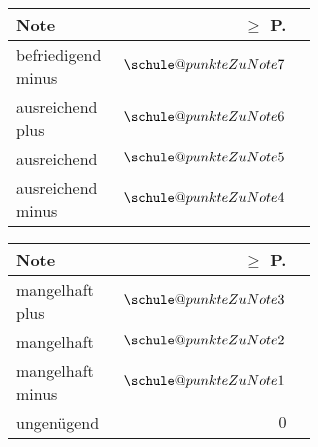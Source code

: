{{{{            }
            \parbox{.24\linewidth}{
                \tiny
                \begin{tabular}{|p{0.6\linewidth}|r|r|}\hline
                    \rowcolor{black!20}\textbf{Note}  &
                    \textbf{$\ge$ P.}
                    \\\hline
                    befriedigend minus  & $\schule@punkteZuNote{7}$\\\hline
                    \rowcolor{black!10}
                    ausreichend plus  & $\schule@punkteZuNote{6}$\\\hline
                    ausreichend & $\schule@punkteZuNote{5}$\\\hline
                    \rowcolor{black!10}
                    ausreichend minus & $\schule@punkteZuNote{4}$\\\hline
                \end{tabular}
            }
            \parbox{.24\linewidth}{
                \tiny
                \begin{tabular}{|p{0.6\linewidth}|r|r|}\hline
                    \rowcolor{black!20}\textbf{Note}  &
                    \textbf{$\ge$ P.}
                    \\\hline
                    mangelhaft plus & $\schule@punkteZuNote{3}$\\\hline
                    \rowcolor{black!10}
                    mangelhaft  & $\schule@punkteZuNote{2}$\\\hline
                    mangelhaft minus & $\schule@punkteZuNote{1}$\\\hline
                    \rowcolor{black!10}
                    ungenügend & $0$ \\\hline
                \end{tabular}
            }
        }
    }
}
